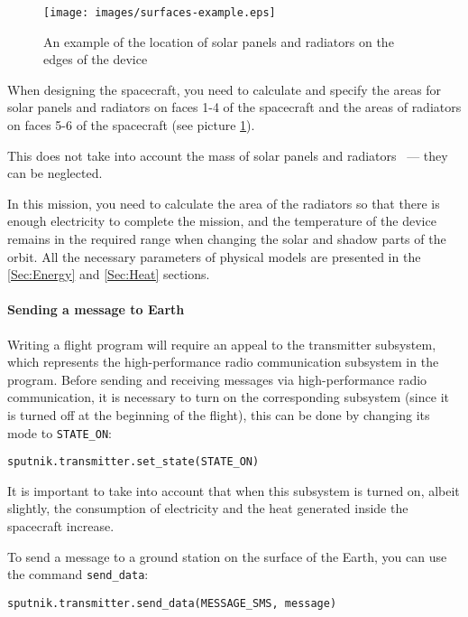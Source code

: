 \documentclass[12pt,a4paper]{article}
\begin{document}
\begin{figure}[tbh]
  \begin{center}
    \texttt{[image: images/surfaces-example.eps]}
    \caption{An example of the location of solar panels and radiators on the edges of the device}
    \label{Pic:surfaces-example}
  \end{center}
\end{figure}

When designing the spacecraft, you need to calculate and specify the areas for solar panels and radiators on faces 1-4 of the spacecraft and the areas of radiators on faces 5-6 of the spacecraft (see picture \ref{Pic:surfaces-example}).

This does not take into account the mass of solar panels and radiators ~--- they can be neglected.

In this mission, you need to calculate the area of the radiators so that there is enough electricity to complete the mission, and the temperature of the device remains in the required range when changing the solar and shadow parts of the orbit. All the necessary parameters of physical models are presented in the \ref{Sec:Energy} and \ref{Sec:Heat} sections.

\paragraph{Sending a message to Earth}

Writing a flight program will require an appeal to the transmitter subsystem, which represents the high-performance radio communication subsystem in the program. Before sending and receiving messages via high-performance radio communication, it is necessary to turn on the corresponding subsystem (since it is turned off at the beginning of the flight), this can be done by changing its mode to \verb'STATE_ON':

\begin{verbatim}
sputnik.transmitter.set_state(STATE_ON)
\end{verbatim}

It is important to take into account that when this subsystem is turned on, albeit slightly, the consumption of electricity and the heat generated inside the spacecraft increase.

To send a message to a ground station on the surface of the Earth, you can use the command
\verb'send_data':

\begin{verbatim}
sputnik.transmitter.send_data(MESSAGE_SMS, message)
\end{verbatim}
\end{document}
